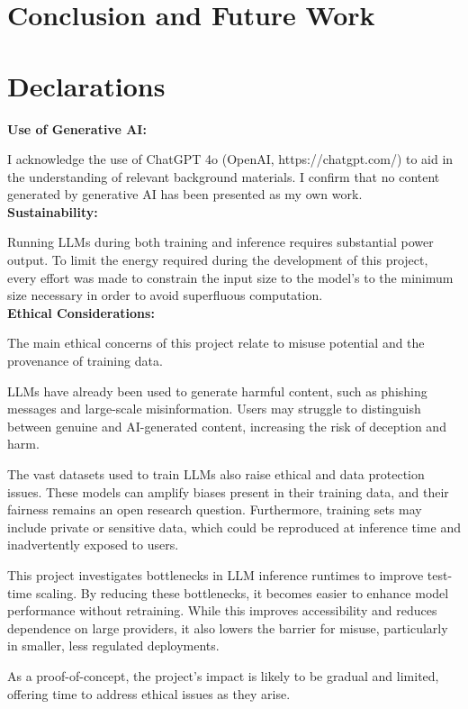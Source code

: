 \documentclass[11pt,twoside]{report}
\begin{document}
\chapter{Conclusion and Future Work}

\chapter{Declarations}
\textbf{Use of Generative AI:} 

I acknowledge the use of ChatGPT 4o (OpenAI, https://chatgpt.com/) to aid in the understanding of relevant background materials. 
I confirm that no content generated by generative AI has been presented as my own work. \\

\textbf{Sustainability:} 

Running LLMs during both training and inference requires substantial power output.
To limit the energy required during the development of this project, every effort was made to constrain the input size to the model's to the minimum size necessary in order to avoid superfluous computation. \\

\textbf{Ethical Considerations:}

The main ethical concerns of this project relate to misuse potential and the provenance of training data.

LLMs have already been used to generate harmful content, such as phishing messages and large-scale misinformation. 
Users may struggle to distinguish between genuine and AI-generated content, increasing the risk of deception and harm.

The vast datasets used to train LLMs also raise ethical and data protection issues. 
These models can amplify biases present in their training data, and their fairness remains an open research question. 
Furthermore, training sets may include private or sensitive data, which could be reproduced at inference time and inadvertently exposed to users.

This project investigates bottlenecks in LLM inference runtimes to improve test-time scaling. 
By reducing these bottlenecks, it becomes easier to enhance model performance without retraining. 
While this improves accessibility and reduces dependence on large providers, it also lowers the barrier for misuse, particularly in smaller, less regulated deployments.

As a proof-of-concept, the project’s impact is likely to be gradual and limited, offering time to address ethical issues as they arise.
\end{document}
